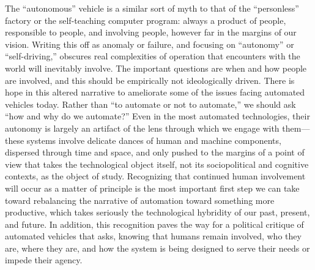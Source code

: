 The ``autonomous'' vehicle is a
similar sort of myth to that of the ``personless'' factory or the
self-teaching computer program: always a 
product of people, responsible to people, and involving people,
however far in the margins of our vision. Writing this off as
anomaly or failure, and focusing on ``autonomy'' or ``self-driving,''
obscures real complexities of operation that encounters with the world
will inevitably involve. The important questions are when and how 
people are
involved, and this should be empirically not ideologically
driven.
There is hope in this altered narrative to ameliorate some of
the issues facing automated vehicles today. 
Rather than ``to automate or not to automate,'' we should ask
``how and why do we automate?'' Even in the most automated
technologies, their 
autonomy is largely an artifact of the lens through which we engage
with them---these systems involve delicate dances of human and machine
components, dispersed through time and space, and only pushed to the
margins of a point of view that takes the technological object itself,
not its sociopolitical and cognitive contexts, as the object of study.
Recognizing that continued human involvement will occur as a matter of
principle is 
the most important first step we can take toward rebalancing the
narrative of automation toward something more productive, which takes
seriously the technological hybridity of our past, present, and future.
In addition, this recognition paves the way for a political critique
of automated vehicles 
that asks, knowing 
that humans remain involved, who they are, where they are, and how
the system is being designed to serve their needs or impede their
agency.


